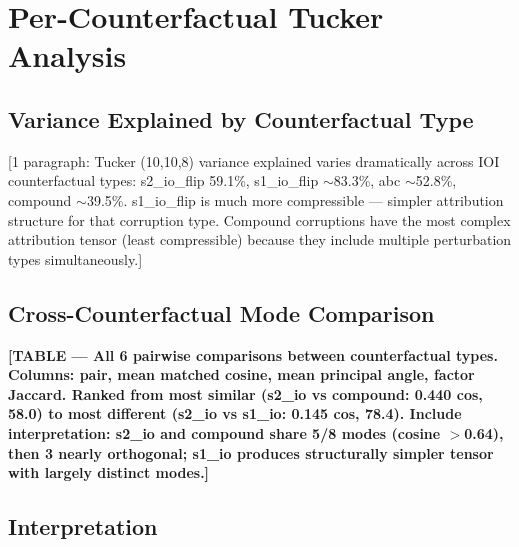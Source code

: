 \documentclass[11pt]{article}
\begin{document}



\section{Per-Counterfactual Tucker Analysis}
\label{app:per_counterfactual}


\subsection{Variance Explained by Counterfactual Type}

[1 paragraph: Tucker (10,10,8) variance explained varies dramatically
across IOI counterfactual types: s2\_io\_flip 59.1\%, s1\_io\_flip
$\sim$83.3\%, abc $\sim$52.8\%, compound $\sim$39.5\%. s1\_io\_flip
is much more compressible --- simpler attribution structure for that
corruption type. Compound corruptions have the most complex attribution
tensor (least compressible) because they include multiple perturbation
types simultaneously.]

\subsection{Cross-Counterfactual Mode Comparison}

\textbf{[TABLE --- All 6 pairwise comparisons between counterfactual
types. Columns: pair, mean matched cosine, mean principal angle, factor
Jaccard. Ranked from most similar (s2\_io vs compound: 0.440 cos,
58.0\textdegree) to most different (s2\_io vs s1\_io: 0.145 cos,
78.4\textdegree). Include interpretation: s2\_io and compound share
5/8 modes (cosine $>$0.64), then 3 nearly orthogonal; s1\_io produces
structurally simpler tensor with largely distinct modes.]}

\subsection{Interpretation}
\end{document}
